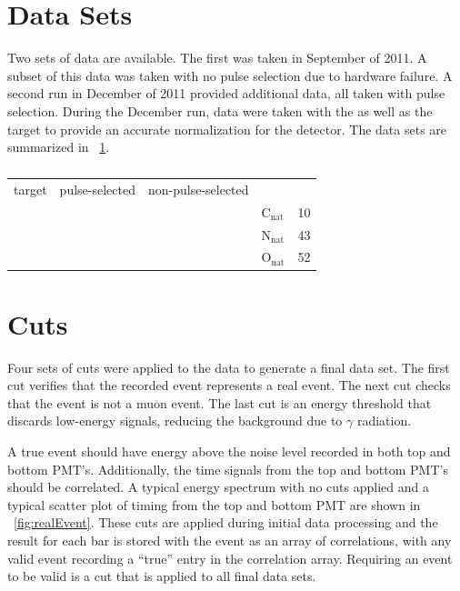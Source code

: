 \section{Data Sets}
Two sets of \reaction data are available.  The first was taken in September of 2011.  A subset of this data was taken with no pulse selection due to hardware failure.  A second run in December of 2011 provided additional data, all taken with pulse selection.  During the December run, data were taken with the \GeTargets as well as the  target to provide an accurate normalization for the detector.  The data sets are summarized in {\tab}~\ref{tab:dataSets}.
\begin{table}[htp]
\centering
\begin{tabular}{lllll}
target & pulse-selected & non-pulse-selected \\
          &           &      & C$_{\text{nat}}$ & 10 \\
          &           &      & N$_{\text{nat}}$ & 43 \\
          &           &      & O$_{\text{nat}}$ & 52 \\
\end{tabular}
\caption{}
\label{tab:dataSets}
\end{table}

\section{Cuts}
\label{sec:cuts}
Four sets of cuts were applied to the data to generate a final data set.  The first cut verifies that the recorded event represents a real event.  The next cut checks that the event is not a muon event.  The last cut is an energy threshold that discards low-energy signals, reducing the background due to $\gamma$ radiation.

A true event should have energy above the noise level recorded in both top and bottom PMT's.  Additionally, the time signals from the top and bottom PMT's should be correlated.  A typical energy spectrum with no cuts applied and a typical scatter plot of timing from the top and bottom PMT are shown in {\fig}~\ref{fig:realEvent}.  These cuts are applied during initial data processing and the result for each bar is stored with the event as an array of correlations, with any valid event recording a ``true'' entry in the correlation array.  Requiring an event to be valid is a cut that is applied to all final data sets.

